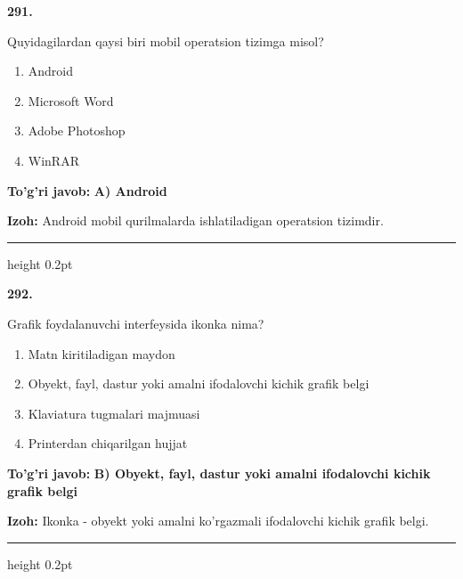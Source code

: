 \documentclass[10pt,a4paper]{article}
\begin{document}
{\bfseries\sffamily\color{ink} 291.}
\par
Quyidagilardan qaysi biri mobil operatsion tizimga misol?
\begin{enumerate}[label=\Alph*),leftmargin=9mm]
\item Android
\item Microsoft Word
\item Adobe Photoshop
\item WinRAR
\end{enumerate}
\begin{tcolorbox}[enhanced,breakable,colback=teal!4,colframe=teal!60!black,boxrule=0.45pt,arc=1.2mm,left=2.7mm,right=2.7mm,top=1.8mm,bottom=1.8mm,before skip=2mm,after skip=2mm]
{\bfseries\sffamily\color{teal}To'g'ri javob:} \textbf{A) Android}
\par\smallskip
{\bfseries Izoh:} Android mobil qurilmalarda ishlatiladigan operatsion tizimdir.
\end{tcolorbox}
\vspace{2mm}\hrule height 0.2pt\vspace{3mm}

{\bfseries\sffamily\color{ink} 292.}
\par
Grafik foydalanuvchi interfeysida ikonka nima?
\begin{enumerate}[label=\Alph*),leftmargin=9mm]
\item Matn kiritiladigan maydon
\item Obyekt, fayl, dastur yoki amalni ifodalovchi kichik grafik belgi
\item Klaviatura tugmalari majmuasi
\item Printerdan chiqarilgan hujjat
\end{enumerate}
\begin{tcolorbox}[enhanced,breakable,colback=teal!4,colframe=teal!60!black,boxrule=0.45pt,arc=1.2mm,left=2.7mm,right=2.7mm,top=1.8mm,bottom=1.8mm,before skip=2mm,after skip=2mm]
{\bfseries\sffamily\color{teal}To'g'ri javob:} \textbf{B) Obyekt, fayl, dastur yoki amalni ifodalovchi kichik grafik belgi}
\par\smallskip
{\bfseries Izoh:} Ikonka - obyekt yoki amalni ko'rgazmali ifodalovchi kichik grafik belgi.
\end{tcolorbox}
\vspace{2mm}\hrule height 0.2pt\vspace{3mm}
\end{document}
